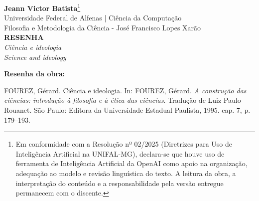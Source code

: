 \documentclass[12pt,a4paper]{article}
\newcommand{\NomeAluno}{Jeann Victor Batista}
\newcommand{\InstituicaoCurso}{Universidade Federal de Alfenas | Ciência da Computação}
\newcommand{\DisciplinaProfessor}{Filosofia e Metodologia da Ciência - José Francisco Lopes Xarão}
\begin{document}
\begin{center}
    \textbf{\NomeAluno}\footnote{Em conformidade com a Resolução nº 02/2025 (Diretrizes para Uso de Inteligência Artificial na UNIFAL-MG), declara-se que houve uso de ferramenta de Inteligência Artificial da OpenAI como apoio na organização, adequação ao modelo e revisão linguística do texto. A leitura da obra, a interpretação do conteúdo e a responsabilidade pela versão entregue permanecem com o discente.}\\[2pt]
    \InstituicaoCurso\\[2pt]
    \DisciplinaProfessor\\[24pt]

    \textbf{\Large RESENHA}\\[6pt]
    \textit{Ciência e ideologia}\\[4pt]
    \textit{\small Science and ideology}
\end{center}

\vspace{18pt}

\noindent\textbf{Resenha da obra:}\par
\noindent\setlength{\parindent}{0pt}%
FOUREZ, Gérard. Ciência e ideologia. In: FOUREZ, Gérard. \textit{A construção das ciências: introdução à filosofia e à ética das ciências}. Tradução de Luiz Paulo Rouanet. São Paulo: Editora da Universidade Estadual Paulista, 1995. cap. 7, p. 179--193.
\setlength{\parindent}{1.25cm}

\vspace{12pt}
\end{document}
